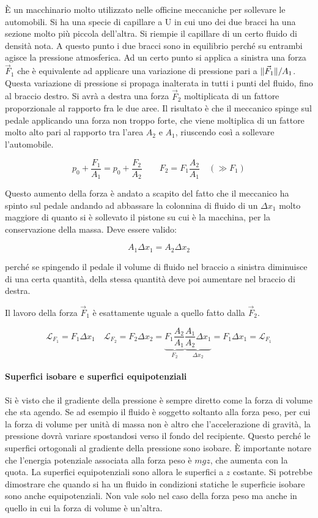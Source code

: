\FloatBarrier
È un macchinario molto utilizzato nelle officine meccaniche per sollevare le automobili.  Si ha una specie di capillare a U in cui uno dei due bracci ha una sezione molto più piccola dell'altra. Si riempie il capillare di un certo fluido di densità nota. A questo punto i due bracci sono in equilibrio perché su entrambi agisce la pressione atmosferica. Ad un certo punto si applica a sinistra una forza $\vec{F}_1$ che è equivalente ad applicare una variazione di pressione pari a $\lVert\vec{F}_1\rVert/A_1$. Questa variazione di pressione si propaga inalterata in tutti i punti del fluido, fino al braccio destro. Si avrà a destra una forza $\vec{F}_2$ moltiplicata di un fattore proporzionale al rapporto fra le due aree. Il risultato è che il meccanico spinge sul pedale applicando una forza non troppo forte, che viene moltiplica di un fattore molto alto pari al rapporto tra l'area $A_2$ e $A_1$, riuscendo così a sollevare l'automobile.

\[
	p_0+ \frac{F_1 }{A_1 } = p_0 + \frac{F_2 }{A_2 } \qquad F_2 = F_1\frac{A_2 }{A_1 } \quad (\gg F_1 )
\]

Questo aumento della forza è andato a scapito del fatto che il meccanico ha spinto sul pedale andando ad abbassare la colonnina di fluido di un $\Delta x_1$ molto maggiore di quanto si è sollevato il pistone su cui è la macchina, per la conservazione della massa. Deve essere valido:

\[
	A_1\Delta x_1 = A_2\Delta x_2
\]

perché se spingendo il pedale il volume di fluido nel braccio a sinistra diminuisce di una certa quantità, della stessa quantità deve poi aumentare nel braccio di destra.

Il lavoro della forza $\vec{F}_1$ è esattamente uguale a quello fatto dalla $\vec{F}_2$.

\[
	\mathcal{L}_{F_1 } = F_1 \Delta x_1 \quad \mathcal{L}_{F_2 } = F_2 \Delta x_2 = \underbrace{F_1\frac{A_2}{A_1} }_{F_2} \underbrace{\frac{A_1}{A_2}\Delta x_1}_{\Delta x_2 } = F_1 \Delta x_1 = \mathcal{L}_{F_1}
\]

\paragraph{Superfici isobare e superfici equipotenziali} Si è visto che il gradiente della pressione è sempre diretto come la forza di volume che sta agendo. Se ad esempio il fluido è soggetto soltanto alla forza peso, per cui la forza di volume per unità di massa non è altro che l'accelerazione di gravità, la pressione dovrà variare spostandosi verso il fondo del recipiente. Questo perché le superfici ortogonali al gradiente della pressione sono isobare. È importante notare che l'energia potenziale associata alla forza peso è $mgz$, che aumenta con la quota. La superfici equipotenziali sono allora le superfici a $z$ costante. Si potrebbe dimostrare che quando si ha un fluido in condizioni statiche le superficie isobare sono anche equipotenziali. Non vale solo nel caso della forza peso ma anche in quello in cui la forza di volume è un'altra.

